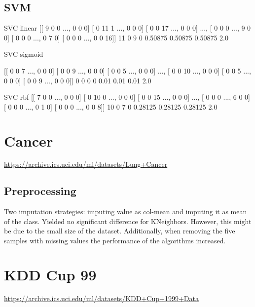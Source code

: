 \subsection{SVM}
SVC linear
[[ 9  0  0 ...,  0  0  0]
 [ 0 11  1 ...,  0  0  0]
 [ 0  0 17 ...,  0  0  0]
 ..., 
 [ 0  0  0 ...,  9  0  0]
 [ 0  0  0 ...,  0  7  0]
 [ 0  0  0 ...,  0  0 16]]
11 0 9 0
0.50875 0.50875 0.50875 2.0

SVC sigmoid

[[ 0  0  7 ...,  0  0  0]
 [ 0  0  9 ...,  0  0  0]
 [ 0  0  5 ...,  0  0  0]
 ..., 
 [ 0  0 10 ...,  0  0  0]
 [ 0  0  5 ...,  0  0  0]
 [ 0  0  9 ...,  0  0  0]]
0 0 0 0
0.01 0.01 0.01 2.0

SVC rbf
[[ 7  0  0 ...,  0  0  0]
 [ 0 10  0 ...,  0  0  0]
 [ 0  0 15 ...,  0  0  0]
 ..., 
 [ 0  0  0 ...,  6  0  0]
 [ 0  0  0 ...,  0  1  0]
 [ 0  0  0 ...,  0  0  8]]
10 0 7 0
0.28125 0.28125 0.28125 2.0

\section{Cancer}
\url{https://archive.ics.uci.edu/ml/datasets/Lung+Cancer}

\subsection{Preprocessing}
Two imputation strategies: imputing value as col-mean and imputing it as mean of the class. Yielded no significant difference for KNeighbors.
However, this might be due to the small size of the dataset. 
Additionally, when removing the five samples with missing values the performance of the algorithms increased. 

\section{KDD Cup 99}
\url{https://archive.ics.uci.edu/ml/datasets/KDD+Cup+1999+Data}